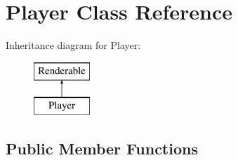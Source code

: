 \hypertarget{class_player}{}\section{Player Class Reference}
\label{class_player}
Inheritance diagram for Player\+:\begin{figure}[H]
\begin{center}
\leavevmode
\includegraphics[height=2.000000cm]{class_player}
\end{center}
\end{figure}
\subsection*{Public Member Functions}
